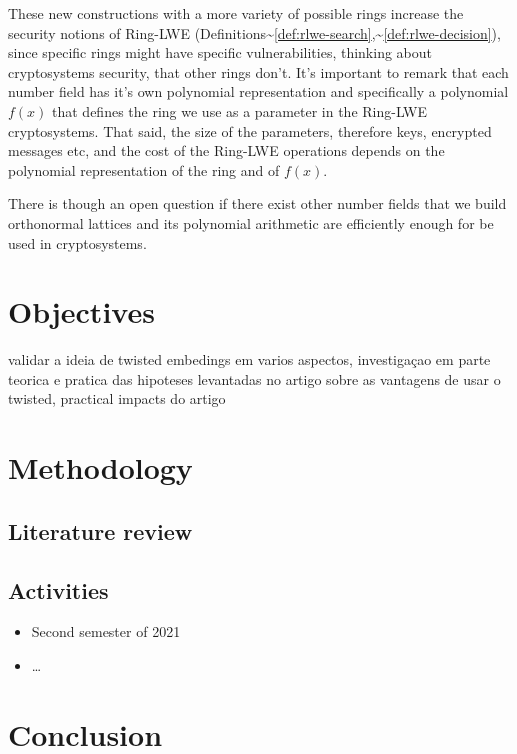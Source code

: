 \documentclass[a4paper,12pt]{article}
\begin{document}
These new constructions with a more variety of possible rings increase the security notions of Ring-LWE (Definitions\textasciitilde{}\ref{def:rlwe-search},\textasciitilde{}\ref{def:rlwe-decision}), since specific rings might have specific vulnerabilities, thinking about cryptosystems security, that other rings don't. It's important to remark that each number field has it's own polynomial representation and specifically a polynomial \(f(x)\) that defines the ring we use as a parameter in the Ring-LWE cryptosystems. That said, the size of the parameters, therefore keys, encrypted messages etc, and the cost of the Ring-LWE operations depends on the polynomial representation of the ring and of \(f(x)\).

There is though an open question if there exist other number fields that we build orthonormal lattices and its polynomial arithmetic are efficiently enough for be used in cryptosystems.

\section{Objectives}
\label{sec:orgd57af41}
validar a ideia de twisted embedings em varios aspectos, investigaçao em parte teorica e pratica das hipoteses levantadas no artigo sobre as vantagens de usar o twisted, practical impacts do artigo
\section{Methodology}
\label{sec:org5dc7f08}
\subsection{Literature review}
\label{sec:org7e06953}
\subsection{Activities}
\label{sec:org5e78b2b}
\begin{itemize}
\item Second semester of 2021
\item \ldots{}
\end{itemize}
\section{Conclusion}
\label{sec:orgb18dbdd}



\end{document}
